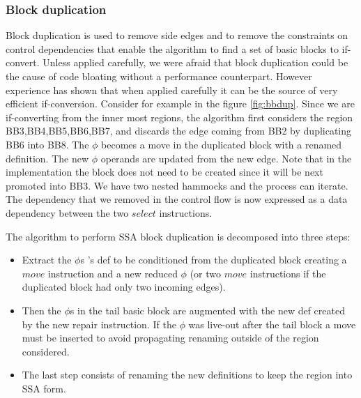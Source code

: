 \subsubsection{Block duplication}

Block duplication is used to remove side edges and to remove the constraints on control dependencies that enable the algorithm to find a set of basic blocks to if-convert. Unless applied carefully, we were afraid that block duplication could be the cause of code bloating without a performance counterpart. However experience has shown that when applied carefully it can be the source of very efficient if-conversion. Consider for example in the figure \ref{fig:bbdup}. Since we are if-converting from the inner most regions, the algorithm first considers the region {BB3,BB4,BB5,BB6,BB7}, and discards the edge coming from BB2 by duplicating BB6 into BB8. The $\phi$ becomes a move in the duplicated block with a renamed definition. The new $\phi$ operands are updated from the new edge. Note that in the implementation the block does not need to be created since it will be next promoted into BB3. We have two nested hammocks and the process can iterate. The dependency that we removed in the control flow is now expressed as a data dependency between the two $select$ instructions.

The algorithm to perform SSA block duplication is decomposed into three steps: 
\begin{itemize}
\item Extract the $\phi$s 's def to be conditioned from the duplicated block creating a $move$ instruction and a new reduced $\phi$ (or two $move$ instructions if the duplicated block had only two incoming edges).
\item Then the $\phi$s in the tail basic block are augmented with the new def created by the new repair instruction. If the $\phi$ was live-out after the tail block a move must be inserted to avoid propagating renaming outside of the region considered. 
\item The last step consists of renaming the new definitions to keep the region into SSA form.
\end{itemize}

